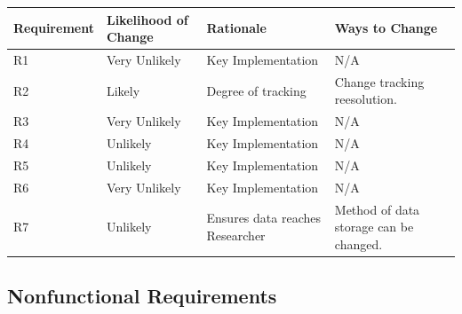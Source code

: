 \documentclass[12pt]{article}
\begin{document}
\begin{tabularx}{1.05\textwidth} { 
  | >{\raggedright\arraybackslash}X 
  | >{\centering\arraybackslash}X 
  | >{\centering\arraybackslash}X 
  | >{\raggedleft\arraybackslash}X | }
 \hline
 Requirement & Likelihood of Change& Rationale & Ways to Change \\
 \hline
 R1  & Very Unlikely  & Key Implementation & N/A  \\
 \hline
 R2  & Likely  &Degree of tracking& Change tracking reesolution.  \\
 \hline
 R3  & Very Unlikely  & Key Implementation & N/A  \\
 \hline
 R4  & Unlikely  & Key Implementation & N/A  \\
\hline
 R5  & Unlikely & Key Implementation &  N/A \\
 \hline
 R6  & Very Unlikely  & Key Implementation & N/A  \\
\hline
 R7  & Unlikely  & Ensures data reaches Researcher & Method of data storage can be changed.  \\
\hline
\end{tabularx}


\subsection{Nonfunctional Requirements}
\end{document}
